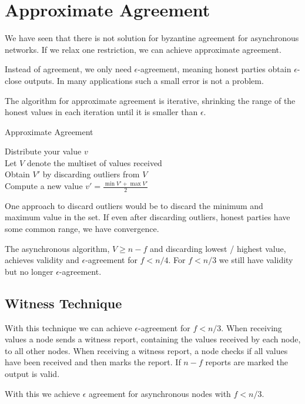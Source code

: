 \section{Approximate Agreement}

We have seen that there is not solution for byzantine agreement for asynchronous networks. If we relax one restriction, we can achieve approximate agreement. \medskip

Instead of agreement, we only need $\epsilon$-agreement, meaning honest parties obtain $\epsilon$-close outputs. In many applications such a small error is not a problem. \medskip

The algorithm for approximate agreement is iterative, shrinking the range of the honest values in each iteration until it is smaller than $\epsilon$. \medskip

\begin{algorithm}[H]
\caption{Approximate Agreement}
	Distribute your value $v$ \\
	Let $V$ denote the multiset of values received\\
	Obtain $V'$ by discarding outliers from $V$\\
	Compute a new value $v' = \frac{\min V' + \max V'}{2}$
\end{algorithm}
\medskip
 
One approach to discard outliers would be to discard the minimum and maximum value in the set. If even after discarding outliers, honest parties have some common range, we have convergence. \medskip
 
The asynchronous algorithm, $V \geq n - f$ and discarding lowest / highest value, achieves validity and $\epsilon$-agreement for $f < n / 4$. For $f < n/3$ we still have validity but no longer $\epsilon$-agreement. \medskip
 
\subsection{Witness Technique}
 
With this technique we can achieve $\epsilon$-agreement for $f < n/3$. When receiving values a node sends a witness report, containing the values received by each node, to all other nodes. When receiving a witness report, a node checks if all values have been received and then marks the report. If $n-f$ reports are marked the output is valid. \medskip
 
With this we achieve $\epsilon$ agreement for asynchronous nodes with $f < n/3$.
 
